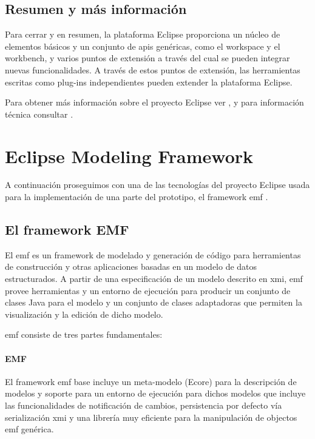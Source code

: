 \documentclass[a4paper,12pt,oneside,spanish]{book}
\begin{document}
\subsection{Resumen y más información}

Para cerrar y en resumen, la plataforma Eclipse proporciona un núcleo de elementos básicos y un conjunto de \glspl{api} genéricas, como el workspace y el workbench, y varios puntos de extensión a través del cual se pueden integrar nuevas funcionalidades. A través de estos puntos de extensión, las herramientas escritas como plug-ins independientes pueden extender la plataforma Eclipse.

Para obtener más información sobre el proyecto Eclipse ver \cite[\url{www.eclipse.org}]{Eclipse}, y para información técnica consultar \cite[Eclipse Platform Technical Overview]{EclipseTech}.


\section{Eclipse Modeling Framework}

A continuación proseguimos con una de las tecnologías del proyecto Eclipse usada para la implementación de una parte del prototipo, el framework \gls{emf} \cite{EMF}.

\subsection{El framework EMF}

El \gls{emf} es un framework de modelado y generación de código para herramientas de construcción y otras aplicaciones basadas en un modelo de datos estructurados. A partir de una especificación de un modelo descrito en \gls{xmi}, \gls{emf} provee herramientas y un entorno de ejecución para producir un conjunto de clases Java para el modelo y un conjunto de clases adaptadoras que permiten la visualización y la edición de dicho modelo.

\gls{emf} consiste de tres partes fundamentales:

\paragraph{EMF}

El framework \gls{emf} base incluye un meta-modelo (Ecore) para la descripción de modelos y soporte para un entorno de ejecución para dichos modelos que incluye las funcionalidades de notificación de cambios, persistencia por defecto vía serialización \gls{xmi} y una librería muy eficiente para la manipulación de objectos \gls{emf} genérica.
\end{document}

